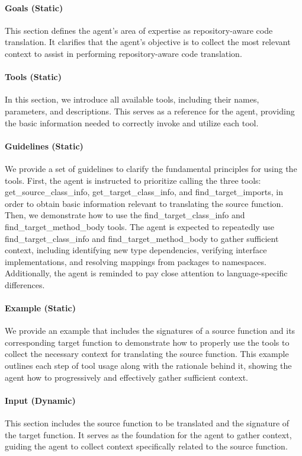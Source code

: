 \paragraph{Goals (Static)} This section defines the agent's area of expertise as repository-aware code translation. It clarifies that the agent's objective is to collect the most relevant context to assist in performing repository-aware code translation.

\paragraph{Tools (Static)} In this section, we introduce all available tools, including their names, parameters, and descriptions. This serves as a reference for the agent, providing the basic information needed to correctly invoke and utilize each tool.

\paragraph{Guidelines (Static)} We provide a set of guidelines to clarify the fundamental principles for using the tools. First, the agent is instructed to prioritize calling the three tools: get\_source\_class\_info, get\_target\_class\_info, and find\_target\_imports, in order to obtain basic information relevant to translating the source function. Then, we demonstrate how to use the find\_target\_class\_info and find\_target\_method\_body tools. The agent is expected to repeatedly use find\_target\_class\_info and find\_target\_method\_body to gather sufficient context, including identifying new type dependencies, verifying interface implementations, and resolving mappings from packages to namespaces. Additionally, the agent is reminded to pay close attention to language-specific differences.

\paragraph{Example (Static)} We provide an example that includes the signatures of a source function and its corresponding target function to demonstrate how to properly use the tools to collect the necessary context for translating the source function. This example outlines each step of tool usage along with the rationale behind it, showing the agent how to progressively and effectively gather sufficient context.

\paragraph{Input (Dynamic)} This section includes the source function to be translated and the signature of the target function. It serves as the foundation for the agent to gather context, guiding the agent to collect context specifically related to the source function.

